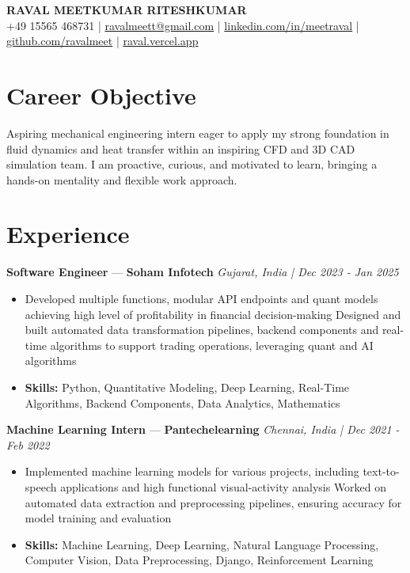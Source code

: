 \documentclass[a4paper,10pt]{article}
\begin{document}
\begin{center}
  {\Large\bfseries RAVAL MEETKUMAR RITESHKUMAR}\\[2pt]
  {\small +49 15565 468731 \;|\; \href{mailto:ravalmeett@gmail.com}{ravalmeett@gmail.com} \;|\; \href{https://www.linkedin.com/in/meetraval/}{linkedin.com/in/meetraval} \;|\; \href{https://github.com/ravalmeet}{github.com/ravalmeet} \;|\; \href{https://raval.vercel.app/}{raval.vercel.app}}
\end{center}
\vspace{-3pt}

\section*{Career Objective}
Aspiring mechanical engineering intern eager to apply my strong foundation in fluid dynamics and heat transfer within an inspiring CFD and 3D CAD simulation team. I am proactive, curious, and motivated to learn, bringing a hands-on mentality and flexible work approach.\par

\section*{Experience}
\textbf{Software Engineer} — \textbf{Soham Infotech} \hfill \textit{Gujarat, India \;|\; Dec 2023 - Jan 2025}\par
\vspace{1pt}
\begin{itemize}
  \item Developed multiple functions, modular API endpoints and quant models achieving high level of profitability in financial decision-making Designed and built automated data transformation pipelines, backend components and real-time algorithms to support trading operations, leveraging quant and AI algorithms
  \item \textbf{Skills:} Python, Quantitative Modeling, Deep Learning, Real-Time Algorithms, Backend Components, Data Analytics, Mathematics
\end{itemize}
\vspace{3pt}
\textbf{Machine Learning Intern} — \textbf{Pantechelearning} \hfill \textit{Chennai, India \;|\; Dec 2021 - Feb 2022}\par
\vspace{1pt}
\begin{itemize}
  \item Implemented machine learning models for various projects, including text-to-speech applications and high functional visual-activity analysis Worked on automated data extraction and preprocessing pipelines, ensuring accuracy for model training and evaluation
  \item \textbf{Skills:} Machine Learning, Deep Learning, Natural Language Processing, Computer Vision, Data Preprocessing, Django, Reinforcement Learning
\end{itemize}
\end{document}

